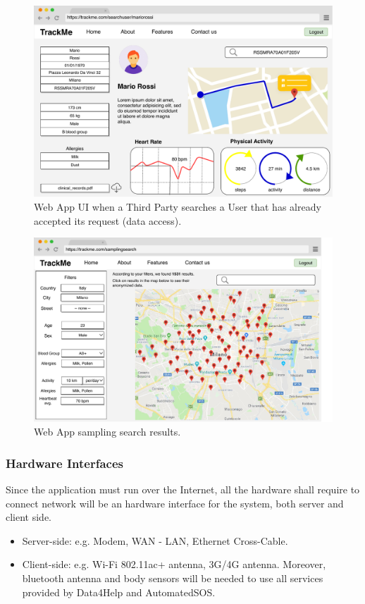 \documentclass[12pt,a4paper]{article}
\begin{document}
					\begin{figure}[H]
						\centering
						\includegraphics[height=0.6\linewidth]{Images/webapp_search_user}
						\caption{Web App UI when a Third Party searches a User that has already accepted its request (data access).}
						\label{fig:webapp_search_user}
					\end{figure}
					\begin{figure}[H]
						\centering
						\includegraphics[height=0.6\linewidth]{Images/webapp_sampling}
						\caption{Web App sampling search results.}
						\label{fig:webapp_sampling}
					\end{figure}

	\newpage
	\subsubsection{Hardware Interfaces}
		Since the application must run over the Internet, all the hardware shall require to connect network will be an hardware interface for the system, both server and client side.
		\begin{itemize}
			\item Server-side: e.g. Modem, WAN - LAN, Ethernet Cross-Cable.
			\item Client-side: e.g. Wi-Fi 802.11ac+ antenna, 3G/4G antenna. Moreover, bluetooth antenna and body sensors will be needed to use all services provided by Data4Help and AutomatedSOS. 
		\end{itemize}
\end{document}

